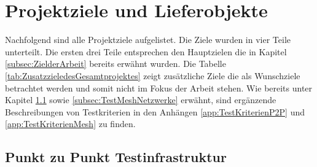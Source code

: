\clearpage
\section{Projektziele und Lieferobjekte}\label{sec:ProjektzieleundLieferobjekte}

Nachfolgend sind alle Projektziele aufgelistet. Die Ziele wurden in vier Teile unterteilt. Die ersten drei Teile entsprechen den Hauptzielen die in Kapitel \ref{subsec:ZielderArbeit} bereits erwähnt wurden. Die Tabelle \ref{tab:ZusatzzieledesGesamtprojektes} zeigt zusätzliche Ziele die als Wunschziele betrachtet werden und somit nicht im Fokus der Arbeit stehen. Wie bereits unter Kapitel \ref{subsec:PunktzuPunktTestinfrastruktur} sowie \ref{subsec:TestMeshNetzwerke} erwähnt, sind ergänzende Beschreibungen von Testkriterien in den Anhängen \ref{app:TestKriterienP2P} und \ref{app:TestKriterienMesh} zu finden.

\subsection{Punkt zu Punkt Testinfrastruktur}\label{subsec:PunktzuPunktTestinfrastruktur}

